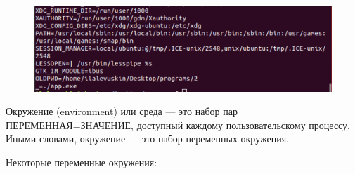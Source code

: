 \documentclass[a4paper,12pt]{article}
\begin{document}
	\newpage

	\begin{figure}[h!]
		\begin{center}
			{\includegraphics[scale = 0.7]{round3.png}}
			\label{ris:round3}
		\end{center}
	\end{figure}
	
	Окружение (environment) или среда — это набор пар
	ПЕРЕМЕННАЯ=ЗНАЧЕНИЕ, доступный каждому пользовательскому
	процессу. Иными словами, окружение — это набор переменных окружения.
	
	Некоторые переменные окружения:
	
\end{document}
